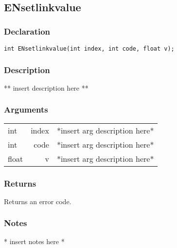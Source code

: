 \subsection{ENsetlinkvalue}
\subsubsection{Declaration}
\begin{lstlisting}
int ENsetlinkvalue(int index, int code, float v);
\end{lstlisting}
\subsubsection{Description}
** insert description here **
\subsubsection{Arguments}
\begin{tabular}{l r p{11cm} }
int&index&*insert arg description here* \\[6pt]
int&code&*insert arg description here* \\[6pt]
float&v&*insert arg description here* \\[6pt]
\end{tabular}
\subsubsection{Returns}
Returns an error code.
\subsubsection{Notes}
* insert notes here *
